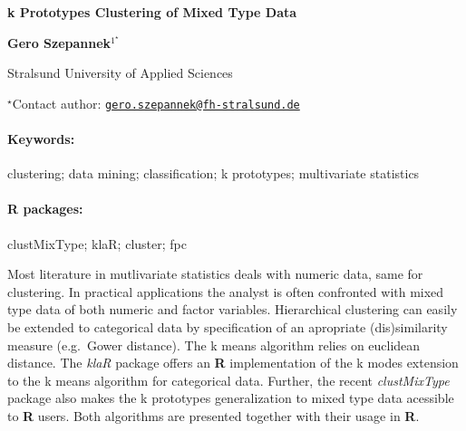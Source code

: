 \documentclass[11pt, a4paper]{article}
\renewcommand{\title}[1]{\begin{center}{\bf \LARGE #1}\end{center}}
\newcommand{\keywords}{\paragraph{Keywords:}}
\newcommand{\packages}{\paragraph{R packages:}}
\begin{document}
\pagestyle{empty}

\title{k Prototypes Clustering of Mixed Type Data}

\begin{center}
  {\bf Gero Szepannek$^{1^\star}$}
\end{center}

\vskip 0.3cm

\begin{affiliations}
\begin{enumerate}
\begin{minipage}{0.915\textwidth}
\centering
\item Stralsund University of Applied Sciences \\[-2pt]
\end{minipage}
\end{enumerate}
$^\star$Contact author: \href{mailto:gero.szepannek@fh-stralsund.de}{\nolinkurl{gero.szepannek@fh-stralsund.de}}\\
\end{affiliations}

\vskip 0.5cm

\begin{minipage}{0.915\textwidth}
\keywords clustering; data mining; classification; k prototypes; multivariate
statistics
\packages clustMixType; klaR; cluster; fpc
\end{minipage}

\vskip 0.8cm

Most literature in mutlivariate statistics deals with numeric data, same
for clustering. In practical applications the analyst is often
confronted with mixed type data of both numeric and factor variables.
Hierarchical clustering can easily be extended to categorical data by
specification of an apropriate (dis)similarity measure (e.g.~Gower
distance). The k means algorithm relies on euclidean distance. The
\emph{klaR} package offers an \textbf{R} implementation of the k modes
extension to the k means algorithm for categorical data. Further, the
recent \emph{clustMixType} package also makes the k prototypes
generalization to mixed type data acessible to \textbf{R} users. Both
algorithms are presented together with their usage in \textbf{R}.
\end{document}
